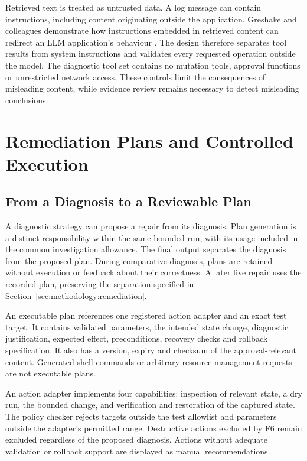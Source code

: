 Retrieved text is treated as untrusted data. A log message can contain
instructions, including content originating outside the application.
Greshake and colleagues demonstrate how instructions embedded in retrieved
content can redirect an LLM application's behaviour
\parencite{greshake2023indirect}. The design therefore separates tool
results from system instructions and validates every requested operation
outside the model. The diagnostic tool set contains no mutation tools,
approval functions or unrestricted network access. These controls limit
the consequences of misleading content, while evidence review remains
necessary to detect misleading conclusions.

\section{Remediation Plans and Controlled Execution}
\label{sec:design:remediation}

\subsection{From a Diagnosis to a Reviewable Plan}

A diagnostic strategy can propose a repair from its diagnosis. Plan
generation is a distinct responsibility within the same bounded run,
with its usage included in the common investigation allowance. The final
output separates the diagnosis from the proposed plan. During comparative
diagnosis, plans are retained without
execution or feedback about their correctness. A later live repair uses
the recorded plan, preserving the separation specified in
Section~\ref{sec:methodology:remediation}.

An executable plan references one registered action adapter and an exact
test target. It contains validated parameters, the intended state change,
diagnostic justification, expected effect, preconditions, recovery checks
and rollback specification. It also has a version, expiry and checksum of
the approval-relevant content. Generated shell commands or arbitrary
resource-management requests are not executable plans.

An action adapter implements four capabilities: inspection of relevant
state, a dry run, the bounded change, and verification and restoration of
the captured state. The policy checker rejects targets outside the test
allowlist and parameters outside the adapter's permitted range. Destructive
actions excluded by F6 remain excluded regardless of the proposed
diagnosis. Actions without adequate validation or rollback support are
displayed as manual recommendations.

